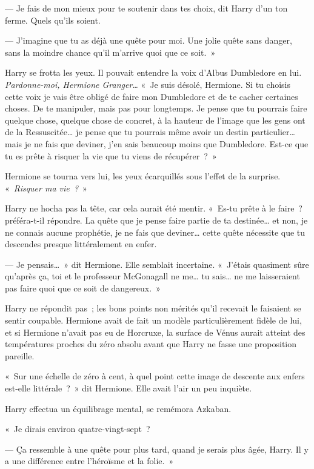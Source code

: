 --- Je fais de mon mieux pour te soutenir dans tes choix, dit Harry d'un ton ferme. Quels qu'ils soient.

--- J'imagine que tu as déjà une quête pour moi. Une jolie quête sans danger, sans la moindre chance qu'il m'arrive quoi que ce soit.~»

Harry se frotta les yeux. Il pouvait entendre la voix d'Albus Dumbledore en lui. \emph{Pardonne-moi, Hermione Granger…} «~Je suis désolé, Hermione. Si tu choisis cette voix je vais être obligé de faire mon Dumbledore et de te cacher certaines choses. De te manipuler, mais pas pour longtemps. Je pense que tu pourrais faire quelque chose, quelque chose de concret, à la hauteur de l'image que les gens ont de la Ressuscitée… je pense que tu pourrais même avoir un destin particulier… mais je ne fais que deviner, j'en sais beaucoup moins que Dumbledore. Est-ce que tu es prête à risquer la vie que tu viens de récupérer~?~»

Hermione se tourna vers lui, les yeux écarquillés sous l'effet de la surprise. «~\emph{Risquer ma vie~?}~»

Harry ne hocha pas la tête, car cela aurait été mentir. «~Es-tu prête à le faire~? préféra-t-il répondre. La quête que je pense faire partie de ta destinée… et non, je ne connais aucune prophétie, je ne fais que deviner… cette quête nécessite que tu descendes presque littéralement en enfer.

--- Je pensais…~» dit Hermione. Elle semblait incertaine. «~J'étais quasiment sûre qu'après ça, toi et le professeur McGonagall ne me… tu sais… ne me laisseraient pas faire quoi que ce soit de dangereux.~»

Harry ne répondit pas~; les bons points non mérités qu'il recevait le faisaient se sentir coupable. Hermione avait de fait un modèle particulièrement fidèle de lui, et si Hermione n'avait pas eu de Horcruxe, la surface de Vénus aurait atteint des températures proches du zéro absolu avant que Harry ne fasse une proposition pareille.

«~Sur une échelle de zéro à cent, à quel point cette image de descente aux enfers est-elle littérale~?~» dit Hermione. Elle avait l'air un peu inquiète.

Harry effectua un équilibrage mental, se remémora Azkaban.

«~Je dirais environ quatre-vingt-sept~?

--- Ça ressemble à une quête pour plus tard, quand je serais plus âgée, Harry. Il y a une différence entre l'héroïsme et la folie.~»

